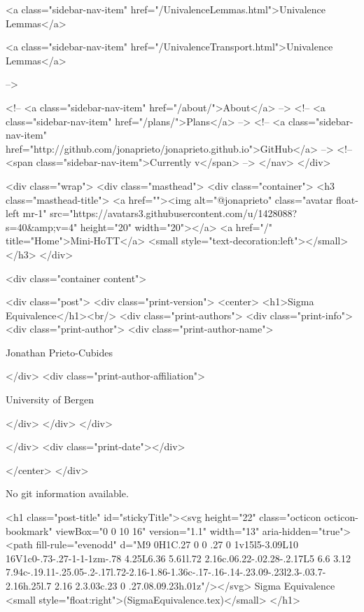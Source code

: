           <a class="sidebar-nav-item" href="/UnivalenceLemmas.html">Univalence Lemmas</a>
        
      
    
      
        
          <a class="sidebar-nav-item" href="/UnivalenceTransport.html">Univalence Lemmas</a>
        
      
     -->

    <!-- <a class="sidebar-nav-item" href="/about/">About</a> -->
    <!-- <a class="sidebar-nav-item" href="/plans/">Plans</a> -->
    <!-- <a class="sidebar-nav-item" href="http://github.com/jonaprieto/jonaprieto.github.io">GitHub</a> -->
    <!-- <span class="sidebar-nav-item">Currently v</span> -->
  </nav>
</div>

    <div class="wrap">
      <div class="masthead">
        <div class="container">
          <h3 class="masthead-title">
            <a href=""><img alt="@jonaprieto" class="avatar float-left mr-1" src="https://avatars3.githubusercontent.com/u/1428088?s=40&amp;v=4" height="20" width="20"></a>
            <a href="/" title="Home">Mini-HoTT</a>
            <small style="text-decoration:left"></small>
          </h3>
        </div>
      
      <div class="container content">
        







<div class="post">
  <div class="print-version">
    <center>
      <h1>Sigma Equivalence</h1><br/>
        <div class="print-authors">
          <div class="print-info">
            <div class="print-author">
              <div class="print-author-name">
                
                  Jonathan Prieto-Cubides
                
              </div>
              <div class="print-author-affiliation">
                
                  University of Bergen
                
                </div>
            </div>
          </div>
          
          
        </div>
        <div class="print-date"></div>
        
        
    </center>
  </div>

  
  No git information available.
  

  <h1 class="post-title" id="stickyTitle"><svg height="22" class="octicon octicon-bookmark" viewBox="0 0 10 16" version="1.1" width="13" aria-hidden="true"><path fill-rule="evenodd" d="M9 0H1C.27 0 0 .27 0 1v15l5-3.09L10 16V1c0-.73-.27-1-1-1zm-.78 4.25L6.36 5.61l.72 2.16c.06.22-.02.28-.2.17L5 6.6 3.12 7.94c-.19.11-.25.05-.2-.17l.72-2.16-1.86-1.36c-.17-.16-.14-.23.09-.23l2.3-.03.7-2.16h.25l.7 2.16 2.3.03c.23 0 .27.08.09.23h.01z"/></svg> Sigma Equivalence <small style="float:right">(SigmaEquivalence.tex)</small>
  </h1>

